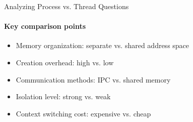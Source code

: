 \begin{KR}{Analyzing Process vs. Thread Questions}
    \paragraph{Key comparison points}
    \begin{itemize}
        \item Memory organization: separate vs. shared address space
        \item Creation overhead: high vs. low
        \item Communication methods: IPC vs. shared memory
        \item Isolation level: strong vs. weak
        \item Context switching cost: expensive vs. cheap
    \end{itemize}
\end{KR}


